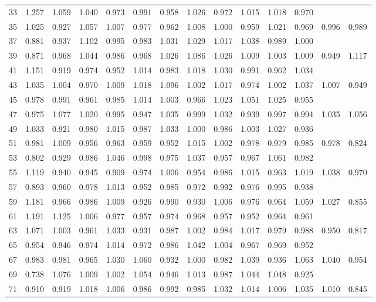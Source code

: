 \begin{table}[!hp]
\begin{tabular}{c|ccccccccccccc}
33 & 1.257 & 1.059 & 1.040 & 0.973 & 0.991 & 0.958 & 1.026 & 0.972 & 1.015 & 1.018 & 0.970 \\
35 & 1.025 & 0.927 & 1.057 & 1.007 & 0.977 & 0.962 & 1.008 & 1.000 & 0.959 & 1.021 & 0.969 & 0.996 & 0.989 \\
37 & 0.881 & 0.937 & 1.102 & 0.995 & 0.983 & 1.031 & 1.029 & 1.017 & 1.038 & 0.989 & 1.000 \\
39 & 0.871 & 0.968 & 1.044 & 0.986 & 0.968 & 1.026 & 1.086 & 1.026 & 1.009 & 1.003 & 1.009 & 0.949 & 1.117 \\
41 & 1.151 & 0.919 & 0.974 & 0.952 & 1.014 & 0.983 & 1.018 & 1.030 & 0.991 & 0.962 & 1.034 \\
43 & 1.035 & 1.004 & 0.970 & 1.009 & 1.018 & 1.096 & 1.002 & 1.017 & 0.974 & 1.002 & 1.037 & 1.007 & 0.949 \\
45 & 0.978 & 0.991 & 0.961 & 0.985 & 1.014 & 1.003 & 0.966 & 1.023 & 1.051 & 1.025 & 0.955 \\
47 & 0.975 & 1.077 & 1.020 & 0.995 & 0.947 & 1.035 & 0.999 & 1.032 & 0.939 & 0.997 & 0.994 & 1.035 & 1.056 \\
49 & 1.033 & 0.921 & 0.980 & 1.015 & 0.987 & 1.033 & 1.000 & 0.986 & 1.003 & 1.027 & 0.936 \\
51 & 0.981 & 1.009 & 0.956 & 0.963 & 0.959 & 0.952 & 1.015 & 1.002 & 0.978 & 0.979 & 0.985 & 0.978 & 0.824 \\
53 & 0.802 & 0.929 & 0.986 & 1.046 & 0.998 & 0.975 & 1.037 & 0.957 & 0.967 & 1.061 & 0.982 \\
55 & 1.119 & 0.940 & 0.945 & 0.909 & 0.974 & 1.006 & 0.954 & 0.986 & 1.015 & 0.963 & 1.019 & 1.038 & 0.970 \\
57 & 0.893 & 0.960 & 0.978 & 1.013 & 0.952 & 0.985 & 0.972 & 0.992 & 0.976 & 0.995 & 0.938 \\
59 & 1.181 & 0.966 & 0.986 & 1.009 & 0.926 & 0.990 & 0.930 & 1.006 & 0.976 & 0.964 & 1.059 & 1.027 & 0.855 \\
61 & 1.191 & 1.125 & 1.006 & 0.977 & 0.957 & 0.974 & 0.968 & 0.957 & 0.952 & 0.964 & 0.961 \\
63 & 1.071 & 1.003 & 0.961 & 1.033 & 0.931 & 0.987 & 1.002 & 0.984 & 1.017 & 0.979 & 0.988 & 0.950 & 0.817 \\
65 & 0.954 & 0.946 & 0.974 & 1.014 & 0.972 & 0.986 & 1.042 & 1.004 & 0.967 & 0.969 & 0.952 \\
67 & 0.983 & 0.981 & 0.965 & 1.030 & 1.060 & 0.932 & 1.000 & 0.982 & 1.039 & 0.936 & 1.063 & 1.040 & 0.954 \\
69 & 0.738 & 1.076 & 1.009 & 1.002 & 1.054 & 0.946 & 1.013 & 0.987 & 1.044 & 1.048 & 0.925 \\
71 & 0.910 & 0.919 & 1.018 & 1.006 & 0.986 & 0.992 & 0.985 & 1.032 & 1.014 & 1.006 & 1.035 & 1.010 & 0.845 \\
\hline \hline
\end{tabular}
\end{table}